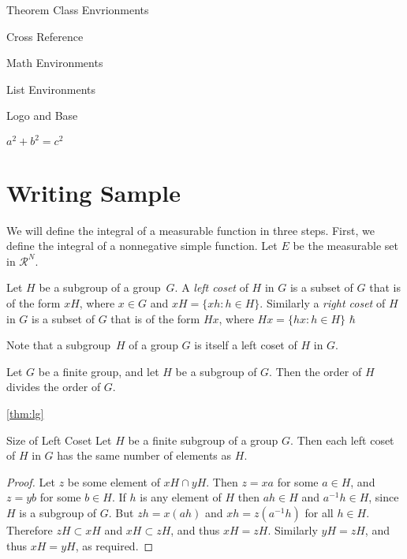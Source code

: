 \documentclass[11pt,fancy,authoryear]{elegantbook}
\begin{document}
\begin{introduction}
\item Theorem Class Envrionments
\item Cross Reference
\item Math Environments
\item List Environments
\item Logo and Base 
\item $a^2+b^2=c^2$
\end{introduction}


\lipsum[1]

\section{Writing Sample}

We will define the integral of a measurable function in three steps. First, we define the integral of a nonnegative simple function. Let $E$ be the measurable set in $\mathcal{R}^N$.

\begin{definition}
Let $H$ be a subgroup of a group~$G$.  A \emph{left coset} of $H$ in $G$ is a subset of $G$ that is of the form $xH$, where $x \in G$ and $xH = \{ xh : h \in H \}$. Similarly a \emph{right coset} of $H$ in $G$ is a subset of $G$ that is of the form $Hx$, where $Hx = \{ hx : h \in H \}$ $\hbar$
\end{definition}

\begin{note}
Note that a subgroup~$H$ of a group $G$ is itself a left coset of $H$ in $G$.
\end{note}

\lipsum[2]

\begin{theorem} \label{thm:lg}
Let $G$ be a finite group, and let $H$ be a subgroup of $G$.  Then the order of $H$ divides the order of $G$.
\end{theorem}

\ref{thm:lg}
\lipsum[3]

   
\begin{proposition}{Size of Left Coset}{}
Let $H$ be a finite subgroup of a group $G$.  Then each left coset of $H$ in $G$ has the same number of elements as $H$.
\end{proposition}

\begin{proof}
Let $z$ be some element of $xH \cap yH$.  Then $z = xa$ for some $a \in H$, and $z = yb$ for some $b \in H$. If $h$ is any element of $H$ then $ah \in H$ and $a^{-1}h \in H$, since $H$ is a subgroup of $G$. But $zh = x(ah)$ and $xh = z(a^{-1}h)$ for all $h \in H$. Therefore $zH \subset xH$ and $xH \subset zH$, and thus $xH = zH$.  Similarly $yH = zH$, and thus $xH = yH$, as required. 
\end{proof}
\end{document}
